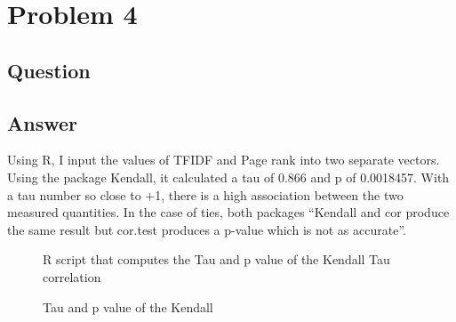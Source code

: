 \section{Problem 4}

\subsection{Question}



\subsection{Answer}
\vspace{2mm}
Using R, I input the values of TFIDF and Page rank into two separate vectors.
Using the package\cite{package} Kendall\cite{kendall}, it calculated a tau of 0.866 and p of 0.0018457.
With a tau number so close to +1, there is a high association between the two measured quantities.
In the case of ties, both packages \enquote{Kendall and cor produce the same result but cor.test produces a p-value which is not as accurate}.
\vspace{5mm}

\vspace{5mm}
\begin{figure}[h]
\centering
{}
\caption{R script that computes the Tau and p value of the Kendall Tau correlation}
\label{fig:fig1}
\end{figure}
\newpage
\vspace{5mm}
\begin{figure}[h]
\centering
{}
\caption{Tau and p value of the Kendall}
\label{fig:fig2}
\end{figure}


